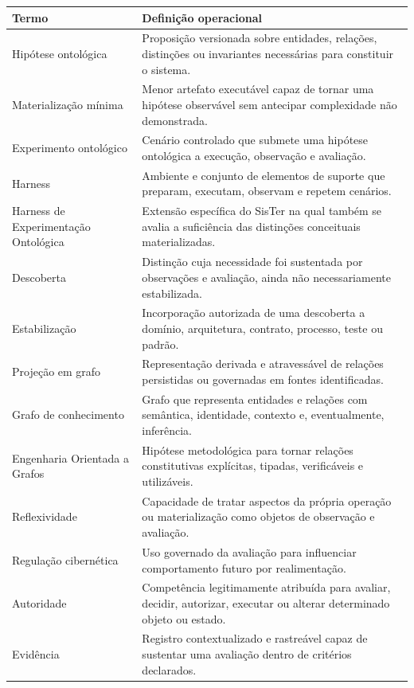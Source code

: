 \documentclass[11pt,a4paper,oneside]{article}
\begin{document}
\begin{longtable}{P{3.6cm}P{9.8cm}}
\toprule
\textbf{Termo} & \textbf{Definição operacional} \\
\midrule
\endhead
Hipótese ontológica & Proposição versionada sobre entidades, relações, distinções ou invariantes necessárias para constituir o sistema. \\
Materialização mínima & Menor artefato executável capaz de tornar uma hipótese observável sem antecipar complexidade não demonstrada. \\
Experimento ontológico & Cenário controlado que submete uma hipótese ontológica a execução, observação e avaliação. \\
Harness & Ambiente e conjunto de elementos de suporte que preparam, executam, observam e repetem cenários. \\
Harness de Experimentação Ontológica & Extensão específica do SisTer na qual também se avalia a suficiência das distinções conceituais materializadas. \\
Descoberta & Distinção cuja necessidade foi sustentada por observações e avaliação, ainda não necessariamente estabilizada. \\
Estabilização & Incorporação autorizada de uma descoberta a domínio, arquitetura, contrato, processo, teste ou padrão. \\
Projeção em grafo & Representação derivada e atravessável de relações persistidas ou governadas em fontes identificadas. \\
Grafo de conhecimento & Grafo que representa entidades e relações com semântica, identidade, contexto e, eventualmente, inferência. \\
Engenharia Orientada a Grafos & Hipótese metodológica para tornar relações constitutivas explícitas, tipadas, verificáveis e utilizáveis. \\
Reflexividade & Capacidade de tratar aspectos da própria operação ou materialização como objetos de observação e avaliação. \\
Regulação cibernética & Uso governado da avaliação para influenciar comportamento futuro por realimentação. \\
Autoridade & Competência legitimamente atribuída para avaliar, decidir, autorizar, executar ou alterar determinado objeto ou estado. \\
Evidência & Registro contextualizado e rastreável capaz de sustentar uma avaliação dentro de critérios declarados. \\
\bottomrule
\end{longtable}
\end{document}
